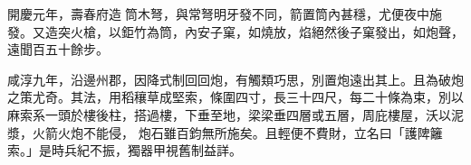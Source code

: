\begin{pinyinscope}
 開慶元年，壽春府造𫧝筒木弩，與常弩明牙發不同，箭置筒內甚穩，尤便夜中施發。又造突火槍，以鉅竹為筒，內安子窠，如燒放，焰絕然後子窠發出，如炮聲，遠聞百五十餘步。



 咸淳九年，沿邊州郡，因降式制回回炮，有觸類巧思，別置炮遠出其上。且為破炮之策尤奇。其法，用稻穰草成堅索，條圍四寸，長三十四尺，每二十條為束，別以麻索系一頭於樓後柱，搭過樓，下垂至地，梁梁垂四層或五層，周庇樓屋，沃以泥漿，火箭火炮不能侵，
 炮石雖百鈞無所施矣。且輕便不費財，立名曰「護陴籬索。」是時兵紀不振，獨器甲視舊制益詳。



\end{pinyinscope}